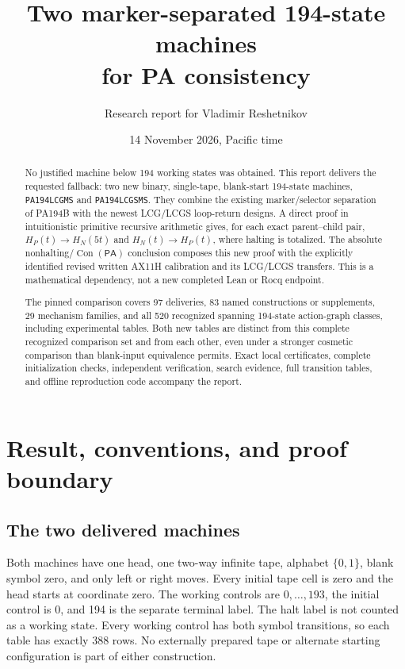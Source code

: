 \documentclass[11pt]{article}
\title{Two marker-separated 194-state machines\\for PA consistency}
\author{Research report for Vladimir Reshetnikov}
\date{14 November 2026, Pacific time}
\newcommand{\pa}{\mathsf{PA}}
\newcommand{\Con}{\operatorname{Con}}
\begin{document}
\maketitle
\begin{abstract}
No justified machine below 194 working states was obtained. This report
delivers the requested fallback: two new binary, single-tape, blank-start
194-state machines, \texttt{PA194LCGMS} and \texttt{PA194LCGSMS}.
They combine the existing marker/selector separation of PA194B with the
newest LCG/LCGS loop-return designs. A direct proof in intuitionistic
primitive recursive arithmetic gives, for each exact parent--child pair,
$H_P(t)\to H_N(5t)$ and $H_N(t)\to H_P(t)$, where halting is totalized.
The absolute nonhalting/\(\Con(\pa)\) conclusion composes this new proof
with the explicitly identified revised written AX11H calibration and its
LCG/LCGS transfers. This is a mathematical dependency, not a new completed
Lean or Rocq endpoint.

The pinned comparison covers 97 deliveries, 83 named constructions or
supplements, 29 mechanism families, and all 520 recognized spanning
194-state action-graph classes, including experimental tables. Both new
tables are distinct from this complete recognized comparison set and from
each other, even under a stronger cosmetic comparison than blank-input
equivalence permits. Exact local certificates, complete initialization
checks, independent verification, search evidence, full transition tables,
and offline reproduction code accompany the report.
\end{abstract}
\tableofcontents
\newpage

\section{Result, conventions, and proof boundary}
\label{sec:result}

\subsection{The two delivered machines}
Both machines have one head, one two-way infinite tape, alphabet
$\{0,1\}$, blank symbol zero, and only left or right moves. Every initial
tape cell is zero and the head starts at coordinate zero. The working
controls are $0,\ldots,193$, the initial control is 0, and 194 is the
separate terminal label. The halt label is not counted as a working state.
Every working control has both symbol transitions, so each table has
exactly 388 rows. No externally prepared tape or alternate starting
configuration is part of either construction.
\end{document}

